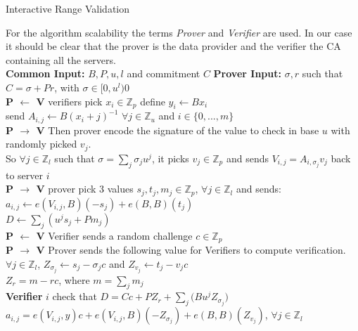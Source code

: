 \documentclass{article}
\begin{document}
\begin{algorithm}
\caption{Interactive Range Validation}\label{euclid}
\begin{algorithmic}[1]

\State For the algorithm scalability the terms \textit{Prover} and \textit{Verifier} are used. In our case it should be clear that the prover is the data provider and the verifier the CA containing all the servers.\\
\State \textbf{Common Input:} $B, P, u, l$ and commitment $C$
\State \textbf{Prover Input:} 
$\sigma, r$ such that $C = \sigma + Pr$, with $\sigma \in [0,u^l)0$\\
\State  \textbf{P $\leftarrow$ V} verifiers pick $x_i \in \mathbb{Z}_p$ define $y_i \gets Bx_i$\\
send $A_{i,j} \gets B(x_i+j)^{-1}$ $ \forall j \in \mathbb{Z}_u$ and $ i \in \{0,...,m\}$\\
\State \textbf{P $\rightarrow$ V} Then prover encode the signature of the value to check in base $u$ with randomly picked $v_j$.\\
So $\forall j \in \mathbb{Z}_l $ such that $ \sigma = \sum_{j}{\sigma_j u^j}$, it picks $v_j \in \mathbb{Z}_p$ and sends $V_{i,j} = A_{i,\sigma_j}v_j$ back to server $i$\\
\State \textbf{P $\rightarrow$ V} prover pick 3 values $s_j,t_j,m_j \in \mathbb{Z}_p $, $\forall j \in \mathbb{Z}_l$ and sends:\\
$a_{i,j} \gets e(V_{i,j},B)(-s_j)+e(B,B)(t_j)$\\
$D \gets \sum_{j}{(u^j s_j + Pm_j)}$\\
\State \textbf{P $\leftarrow$ V} Verifier sends a random challenge $c \in \mathbb{Z}_p$\\
\State \textbf{P $\rightarrow$ V} Prover sends the following value for Verifiers to compute verification.\\
$ \forall j \in \mathbb{Z}_l$, $Z_{\sigma_j} \gets s_j-\sigma_j c$ and $Z_{v_j} \gets t_j-v_j c$\\
$Z_r = m -rc $, where $m = \sum_{j}{m_j}$\\
\State \textbf{Verifier} $i$ check that $D = Cc + PZ_r + \sum_{j}{(Bu^j Z_{\sigma_j}}) $\\
$a_{i,j} = e(V_{i,j},y)c + e(V_{i,j},B)(-Z_{\sigma_j}) + e(B,B)(Z_{v_j})$, $\forall j \in \mathbb{Z}_l$
\end{algorithmic}
\end{algorithm}
\end{document}
